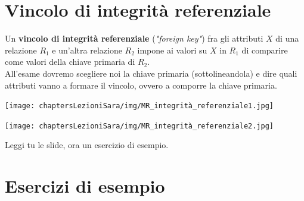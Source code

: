 \section{Vincolo di integrità referenziale}
Un \textbf{vincolo di integrità referenziale} (\textit{"foreign key"}) fra gli attributi $X$ di una relazione $R_1$ e un'altra relazione $R_2$ impone ai valori su $X$ in $R_1$ di comparire come valori della chiave primaria di $R_2$.
\\All'esame dovremo scegliere noi la chiave primaria (sottolineandola) e dire quali attributi vanno a formare il vincolo, ovvero a comporre la chiave primaria.
\begin{center}
    \texttt{[image: chaptersLezioniSara/img/MR\_integrità\_referenziale1.jpg]}
\end{center}
\begin{center}
    \texttt{[image: chaptersLezioniSara/img/MR\_integrità\_referenziale2.jpg]}
\end{center}
Leggi tu le slide, ora un esercizio di esempio.

\section{Esercizi di esempio}
